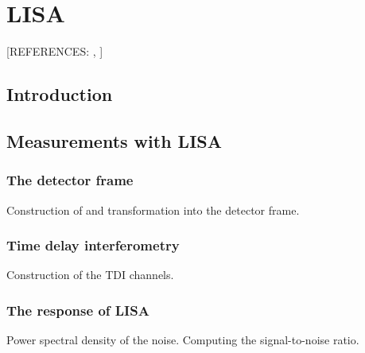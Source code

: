 \chapter{LISA}
 [REFERENCES: \cite{babak2021lisasensitivitysnrcalculations}, \cite{PhysRevD.95.103012}]
\section{Introduction}

\section{Measurements with LISA}

\subsection{The detector frame}

Construction of and transformation into the detector frame.

\subsection{Time delay interferometry}

Construction of the TDI channels.

\subsection{The response of LISA}

Power spectral density of the noise.
Computing the signal-to-noise ratio.


